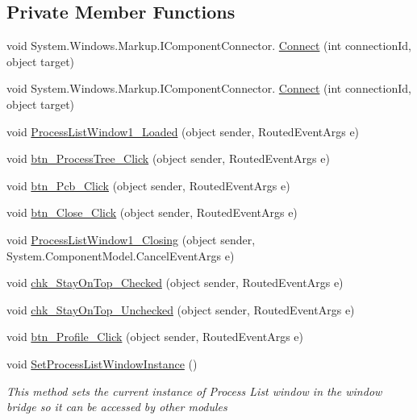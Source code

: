 \subsection*{Private Member Functions}
\begin{DoxyCompactItemize}
\item 
void System.\+Windows.\+Markup.\+I\+Component\+Connector. \hyperlink{class_c_p_u___o_s___simulator_1_1_process_list_window_ad9c147ecacbb79db1dc996cd633688ca}{Connect} (int connection\+Id, object target)
\item 
void System.\+Windows.\+Markup.\+I\+Component\+Connector. \hyperlink{class_c_p_u___o_s___simulator_1_1_process_list_window_ad9c147ecacbb79db1dc996cd633688ca}{Connect} (int connection\+Id, object target)
\item 
void \hyperlink{class_c_p_u___o_s___simulator_1_1_process_list_window_a47705cbd7b8c586030a71c92b6efec00}{Process\+List\+Window1\+\_\+\+Loaded} (object sender, Routed\+Event\+Args e)
\item 
void \hyperlink{class_c_p_u___o_s___simulator_1_1_process_list_window_a4f40b592aeba7a63a2813ce0b2c68cd0}{btn\+\_\+\+Process\+Tree\+\_\+\+Click} (object sender, Routed\+Event\+Args e)
\item 
void \hyperlink{class_c_p_u___o_s___simulator_1_1_process_list_window_aa3cb1b9be5f5fd189f3fe2b3adb4fe23}{btn\+\_\+\+Pcb\+\_\+\+Click} (object sender, Routed\+Event\+Args e)
\item 
void \hyperlink{class_c_p_u___o_s___simulator_1_1_process_list_window_a76ff3bbbde41ee3b43a826db5c3355c3}{btn\+\_\+\+Close\+\_\+\+Click} (object sender, Routed\+Event\+Args e)
\item 
void \hyperlink{class_c_p_u___o_s___simulator_1_1_process_list_window_a17ebb08c5e04824b3fdfa7477f552f12}{Process\+List\+Window1\+\_\+\+Closing} (object sender, System.\+Component\+Model.\+Cancel\+Event\+Args e)
\item 
void \hyperlink{class_c_p_u___o_s___simulator_1_1_process_list_window_ac9a9b6a3abef8508fd2c050b5897786d}{chk\+\_\+\+Stay\+On\+Top\+\_\+\+Checked} (object sender, Routed\+Event\+Args e)
\item 
void \hyperlink{class_c_p_u___o_s___simulator_1_1_process_list_window_a7523b9874ab1a1cfe42d93c8d3e4f439}{chk\+\_\+\+Stay\+On\+Top\+\_\+\+Unchecked} (object sender, Routed\+Event\+Args e)
\item 
void \hyperlink{class_c_p_u___o_s___simulator_1_1_process_list_window_a9c3ed59d9ab51ea6860ae775f9d2fec1}{btn\+\_\+\+Profile\+\_\+\+Click} (object sender, Routed\+Event\+Args e)
\item 
void \hyperlink{class_c_p_u___o_s___simulator_1_1_process_list_window_a6cda0d14604cb2f49313eb71813e793c}{Set\+Process\+List\+Window\+Instance} ()
\begin{DoxyCompactList}\small\item\em This method sets the current instance of Process List window in the window bridge so it can be accessed by other modules \end{DoxyCompactList}\end{DoxyCompactItemize}
